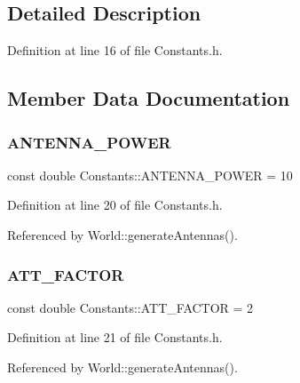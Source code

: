 \subsection{Detailed Description}


Definition at line 16 of file Constants.\+h.



\subsection{Member Data Documentation}
\mbox{\label{class_constants_a3f6f3825098d8eb1dc8081158c46c48a}} 
\subsubsection{A\+N\+T\+E\+N\+N\+A\+\_\+\+P\+O\+W\+ER}
{\footnotesize\ttfamily const double Constants\+::\+A\+N\+T\+E\+N\+N\+A\+\_\+\+P\+O\+W\+ER = 10\hspace{0.3cm}{\ttfamily [static]}}



Definition at line 20 of file Constants.\+h.



Referenced by World\+::generate\+Antennas().

\mbox{\label{class_constants_a3738ccd4e7931b93885bdedf98528293}} 
\subsubsection{A\+T\+T\+\_\+\+F\+A\+C\+T\+OR}
{\footnotesize\ttfamily const double Constants\+::\+A\+T\+T\+\_\+\+F\+A\+C\+T\+OR = 2\hspace{0.3cm}{\ttfamily [static]}}



Definition at line 21 of file Constants.\+h.



Referenced by World\+::generate\+Antennas().

\mbox{\label{class_constants_a4cefd531a29c345b8e0524e864048373}} 
